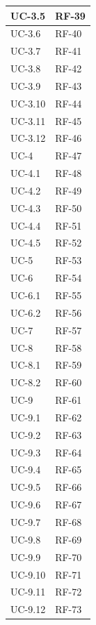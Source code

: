 \documentclass[8pt]{article}
\begin{document}
\begin{longtable}{|>{\centering\arraybackslash}p{4cm}|>{\centering\arraybackslash}p{7cm}|}
            UC-3.5 & RF-39\\ \hline
            UC-3.6 & RF-40\\ \hline
            UC-3.7 & RF-41\\ \hline
            UC-3.8 & RF-42\\ \hline
            UC-3.9 & RF-43\\ \hline
            UC-3.10 & RF-44\\ \hline
            UC-3.11 & RF-45\\ \hline
            UC-3.12 & RF-46\\ \hline
            UC-4 & RF-47\\ \hline
            UC-4.1 & RF-48\\ \hline
            UC-4.2 & RF-49\\ \hline
            UC-4.3 & RF-50\\ \hline
            UC-4.4 & RF-51\\ \hline
            UC-4.5 & RF-52\\ \hline
            UC-5 & RF-53\\ \hline
            UC-6 & RF-54\\ \hline
            UC-6.1 & RF-55\\ \hline
            UC-6.2 & RF-56\\ \hline
            UC-7 & RF-57\\ \hline
            UC-8 & RF-58\\ \hline
            UC-8.1 & RF-59\\ \hline
            UC-8.2 & RF-60\\ \hline
            UC-9 & RF-61\\ \hline
            UC-9.1 & RF-62\\ \hline
            UC-9.2 & RF-63\\ \hline
            UC-9.3 & RF-64\\ \hline
            UC-9.4 & RF-65\\ \hline
            UC-9.5 & RF-66\\ \hline
            UC-9.6 & RF-67\\ \hline
            UC-9.7 & RF-68\\ \hline
            UC-9.8 & RF-69\\ \hline
            UC-9.9 & RF-70\\ \hline
            UC-9.10 & RF-71\\ \hline
            UC-9.11 & RF-72\\ \hline
            UC-9.12 & RF-73\\ \hline
\end{longtable}
\end{document}
